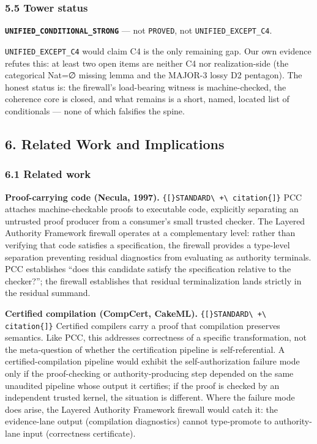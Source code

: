 \documentclass[
  10pt,
]{article}
\DeclareRobustCommand{\texttt}[1]{{\paperSymbolFont\nolinkurl{#1}}}
\begin{document}
\subsubsection{5.5 Tower status}\label{tower-status}

\textbf{\texttt{UNIFIED\_CONDITIONAL\_STRONG}} --- not \texttt{PROVED}, not \texttt{UNIFIED\_EXCEPT\_C4}.

\texttt{UNIFIED\_EXCEPT\_C4} would claim C4 is the only remaining gap. Our own evidence refutes this: at least two open items are neither C4 nor realization-side (the categorical Nat=∅ missing lemma and the MAJOR-3 lossy D2 pentagon). The honest status is: the firewall's load-bearing witness is machine-checked, the coherence core is closed, and what remains is a short, named, located list of conditionals --- none of which falsifies the spine.

\subsection{6. Related Work and Implications}\label{related-work-and-implications}

\subsubsection{6.1 Related work}\label{related-work}

\textbf{Proof-carrying code (Necula, 1997).} \texttt{{[}STANDARD\ +\ citation{]}} PCC attaches machine-checkable proofs to executable code, explicitly separating an untrusted proof producer from a consumer's small trusted checker. The Layered Authority Framework firewall operates at a complementary level: rather than verifying that code satisfies a specification, the firewall provides a type-level separation preventing residual diagnostics from evaluating as authority terminals. PCC establishes ``does this candidate satisfy the specification relative to the checker?''; the firewall establishes that residual terminalization lands strictly in the residual summand.

\textbf{Certified compilation (CompCert, CakeML).} \texttt{{[}STANDARD\ +\ citation{]}} Certified compilers carry a proof that compilation preserves semantics. Like PCC, this addresses correctness of a specific transformation, not the meta-question of whether the certification pipeline is self-referential. A certified-compilation pipeline would exhibit the self-authorization failure mode only if the proof-checking or authority-producing step depended on the same unaudited pipeline whose output it certifies; if the proof is checked by an independent trusted kernel, the situation is different. Where the failure mode does arise, the Layered Authority Framework firewall would catch it: the evidence-lane output (compilation diagnostics) cannot type-promote to authority-lane input (correctness certificate).
\end{document}

